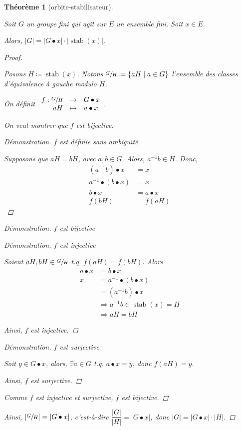 \documentclass{report}
\newcommand*{\card}[1]{\left| #1 \right|}
\newcommand*{\stab}{\operatorname{stab}}
\newtheorem*{thm}{Th\'eor\`eme}
\theoremstyle{definition}
\theoremstyle{remark}
\newenvironment*{subproof}[1][D\'emonstration]
{
\begin{proof}[#1]

}
{
	\renewcommand{\qedsymbol}{$\blacksquare$}
\end{proof}
\renewcommand{\qedsymbol}{$\square$}
}
\newenvironment*{subsubproof}[1][D\'emonstration]
{
\begin{proof}[#1]
}
{
	\renewcommand{\qedsymbol}{$\#$}
\end{proof}
\renewcommand{\qedsymbol}{$\blacksquare$}
}
\begin{document}
	\begin{thm}[orbite-stabilisateur]~

		Soit $G$ un groupe fini qui agit sur $E$ un ensemble fini. Soit $x \in E$.

		Alors, $\card{G} = \card{G \bullet x} \cdot \card{\stab(x)}$.
		\begin{proof}~

			Posons $H \coloneq \stab(x)$. Notons $\sfrac{G}{H} \coloneq \{aH \mid a \in G\}$ l'ensemble des classes d'\'equivalence \`a gauche modulo $H$.

			On d\'efinit $\begin{array}{rcl}
				f:\sfrac{G}{H}&\to&G \bullet x\\
				aH&\mapsto&a \bullet x
			\end{array}$.

			On veut montrer que $f$ est bijective.
			\begin{subproof}{$f$ est d\'efinie sans ambigu\"it\'e}~

				Supposons que $aH=bH$, avec $a,b \in G$. Alors, $a^{-1}b \in H$. Donc,
				\begin{align*}
					(a^{-1}b) \bullet x&= x\\
					a^{-1} \bullet (b \bullet x)&= x\\
					b \bullet x&= a \bullet x\\
					f(bH)&= f(aH)
				\end{align*}
			\end{subproof}
			\begin{subproof}{$f$ est bijective}~

				\begin{subsubproof}{$f$ est injective}~

					Soient $aH, bH \in \sfrac{G}{H}$ t.q. $f(aH) = f(bH)$. Alors
					\begin{align*}
						a \bullet x&= b \bullet x\\
						x&= a^{-1} \bullet (b \bullet x)\\
						&= (a^{-1}b) \bullet x\\
						&\Rightarrow a^{-1}b \in \stab(x) = H\\
						&\Rightarrow aH=bH
					\end{align*}

					Ainsi, $f$ est injective.
				\end{subsubproof}
				\begin{subsubproof}{$f$ est surjective}~

					Soit $y \in G \bullet x$, alors, $\exists a \in G$ t.q. $a \bullet x = y$, donc $f(aH)=y$.

					Ainsi, $f$ est surjective.
				\end{subsubproof}

				Comme $f$ est injective et surjective, $f$ est bijective.
			\end{subproof}

			Ainsi, $\card{\sfrac{G}{H}} = \card{G \bullet x}$, c'est-\`a-dire $\dfrac{\card{G}}{\card{H}} = \card{G \bullet x}$, donc $\card{G} = \card{G \bullet x} \cdot \card{H}$.
		\end{proof}
	\end{thm}
\end{document}

